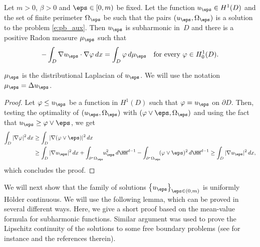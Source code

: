 \begin{lemma}\label{l:subharmonicity}
Let $m>0$, $\beta>0$ and $\eps\in[0,m)$ be fixed. Let the function $u_\eps\in H^1(D)$ and the set of finite perimeter $\Omega_\eps$ be such that the pairs $(u_\eps,\Omega_\eps)$ is a solution to the problem \eqref{e:pb_aux}. Then $u_\eps$ is subharmonic in~$D$ and there is a positive Radon measure $\mu_\eps$ such that
\[-\int_{D}\nabla u_\eps\cdot\nabla \varphi\,dx=\int_{D}\varphi\,d\mu_\eps\quad\text{for every } \varphi\in H^1_0(D).\]
\end{lemma}
\begin{oss}
$\mu_\eps$ is the distributional Laplacian of $u_\eps$. We will use the notation $\mu_\eps=\Delta u_\eps$.
\end{oss}
\begin{proof}
Let $\varphi\le u_\eps$ be a function in $H^1(D)$ such that $\varphi=u_\eps$ on $\partial D$. Then, testing the optimality of $(u_\eps,\Omega_\eps)$ with $(\varphi\vee\eps,\Omega_\eps)$ and using the fact that $u_\eps\ge \varphi\vee\eps$, we get
\begin{align*}
\int_D|\nabla \varphi|^2\,dx&\ge \int_D|\nabla (\varphi\vee \eps)|^2\,dx\\
&\ge \int_D|\nabla u_\eps|^2\,dx +\int_{\partial^\ast\Omega_\eps}\hspace*{-1mm}u_\eps^2\,d\HH^{d-1}-\int_{\partial^\ast\Omega_\eps}\hspace*{-1mm}(\varphi\vee \eps)^2\,d\HH^{d-1}\ge \int_D|\nabla u_\eps|^2\,dx,
\end{align*}
which concludes the proof.
\end{proof}

We will next show that the family of solutions $\big\{u_\eps\big\}_{\eps\in(0,m)}$ is uniformly Hölder continuous.
We will use the following lemma, which can be proved in several different ways. Here, we give a short proof based on the mean-value formula for subharmonic functions. Similar argument was used to prove the Lipschitz continuity of the solutions to some free boundary problems (see for instance \cite{velectures} and the references therein).

